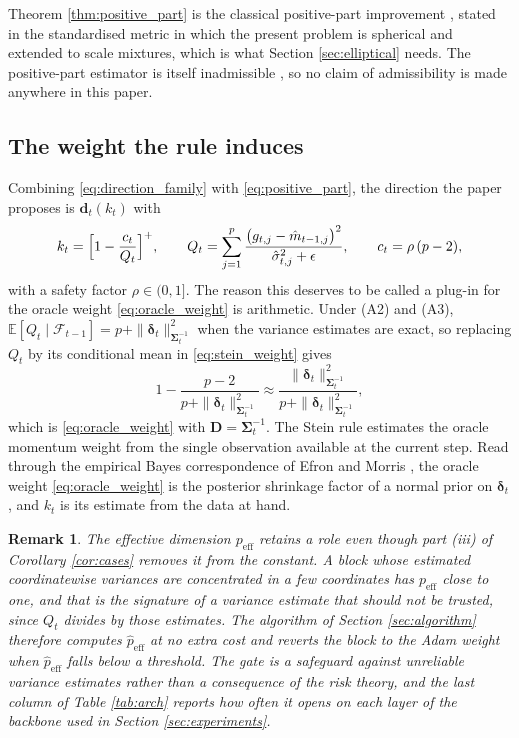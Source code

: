 \documentclass[pdflatex,sn-mathphys-num]{sn-jnl}%
\theoremstyle{thmstyleone}%
\theoremstyle{thmstyletwo}%
\newtheorem{remark}{Remark}%
\theoremstyle{thmstylethree}%
\newcommand{\peff}{p_{\mathrm{eff}}}
\newcommand{\E}{\mathbb{E}}
\begin{document}
Theorem \ref{thm:positive_part} is the classical positive-part improvement \cite{baranchik1970, lehmann1998}, stated in the standardised metric in which the present problem is spherical and extended to scale mixtures, which is what Section \ref{sec:elliptical} needs. The positive-part estimator is itself inadmissible \cite{shao1994}, so no claim of admissibility is made anywhere in this paper.

\subsection{The weight the rule induces}

Combining \eqref{eq:direction_family} with \eqref{eq:positive_part}, the direction the paper proposes is $\bm d_t(k_t)$ with
\begin{equation}
\label{eq:stein_weight}
k_t=\Bigl[1-\frac{c_t}{Q_t}\Bigr]^{+},
\qquad
Q_t=\sum_{j=1}^{p}\frac{\bigl(g_{t,j}-\hat m_{t-1,j}\bigr)^2}{\hat\sigma^2_{t,j}+\epsilon},
\qquad
c_t=\rho\,(p-2),
\end{equation}
with a safety factor $\rho\in(0,1]$. The reason this deserves to be called a plug-in for the oracle weight \eqref{eq:oracle_weight} is arithmetic. Under (A2) and (A3), $\E[Q_t\mid\mathcal F_{t-1}]=p+\|\bm\delta_t\|^2_{\bm\Sigma_t^{-1}}$ when the variance estimates are exact, so replacing $Q_t$ by its conditional mean in \eqref{eq:stein_weight} gives
\begin{equation}
1-\frac{p-2}{p+\|\bm\delta_t\|^2_{\bm\Sigma_t^{-1}}}
\approx
\frac{\|\bm\delta_t\|^2_{\bm\Sigma_t^{-1}}}{p+\|\bm\delta_t\|^2_{\bm\Sigma_t^{-1}}},
\end{equation}
which is \eqref{eq:oracle_weight} with $\bm D=\bm\Sigma_t^{-1}$. The Stein rule estimates the oracle momentum weight from the single observation available at the current step. Read through the empirical Bayes correspondence of Efron and Morris \cite{efronmorris1973, efron2012}, the oracle weight \eqref{eq:oracle_weight} is the posterior shrinkage factor of a normal prior on $\bm\delta_t$, and $k_t$ is its estimate from the data at hand.

\begin{remark}
\label{rem:gate}
The effective dimension $\peff$ retains a role even though part (iii) of Corollary \ref{cor:cases} removes it from the constant. A block whose estimated coordinatewise variances are concentrated in a few coordinates has $\peff$ close to one, and that is the signature of a variance estimate that should not be trusted, since $Q_t$ divides by those estimates. The algorithm of Section \ref{sec:algorithm} therefore computes $\hat\peff$ at no extra cost and reverts the block to the Adam weight when $\hat\peff$ falls below a threshold. The gate is a safeguard against unreliable variance estimates rather than a consequence of the risk theory, and the last column of Table \ref{tab:arch} reports how often it opens on each layer of the backbone used in Section \ref{sec:experiments}.
\end{remark}
\end{document}
